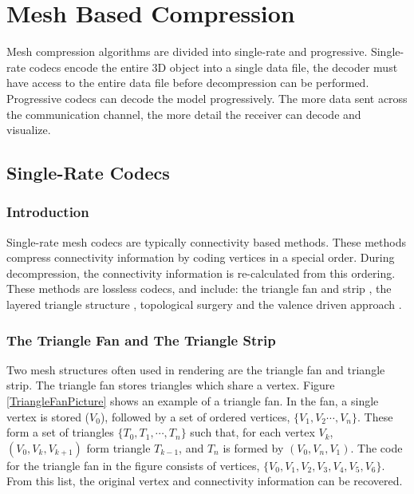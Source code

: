 \section{Mesh Based Compression}

Mesh compression algorithms are divided into single-rate and progressive. Single-rate codecs encode the entire 3D object into a single data file, the decoder must have access to the entire data file before decompression can be performed. Progressive codecs can decode the model progressively. The more data sent across the communication channel, the more detail the receiver can decode and visualize. 

\subsection{Single-Rate Codecs}

\subsubsection{Introduction}

Single-rate mesh codecs are typically connectivity based methods. These methods compress connectivity information by coding vertices in a special order. During decompression, the connectivity information is re-calculated from this ordering. These methods are lossless codecs, and include: the triangle fan and strip \cite{Deering95Geometry}, the layered triangle structure \cite{Bajaj99SingleRate}, topological surgery \cite{Taubin98Geometric} and the valence driven approach \cite{touma98triangle,Alliez01Valence-Driven}. 

\subsubsection{The Triangle Fan and The Triangle Strip}

Two mesh structures often used in rendering are the triangle fan and triangle strip. The triangle fan stores triangles which share a vertex. Figure \ref{TriangleFanPicture} shows an example of a triangle fan. In the fan, a single vertex is stored ($V_0$), followed by a set of ordered vertices, $\{V_1, V_2 \cdots, V_n\}$. These form a set of triangles $\{T_0, T_1, \cdots, T_n\}$ such that, for each vertex $V_k$, $(V_{0}, V_k, V_{k+1})$ form triangle $T_{k-1}$, and $T_n$ is formed by $(V_{0}, V_{n}, V_{1})$. The code for the triangle fan in the figure consists of vertices, $\{V_0, V_1, V_2, V_3, V_4, V_5, V_6\}$. From this list, the original vertex and connectivity information can be recovered.

